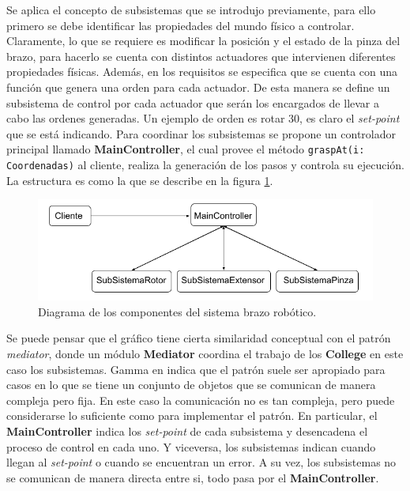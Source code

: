 Se aplica el concepto de subsistemas que se introdujo previamente, para ello primero se debe identificar las propiedades del mundo físico a controlar. Claramente, lo que se requiere es modificar la posición y el estado de la pinza del brazo, para hacerlo se cuenta con distintos actuadores que intervienen diferentes propiedades físicas. Además, en los requisitos se especifica que se cuenta con una función que genera una orden para cada actuador. De esta manera se define un subsistema de control por cada actuador que serán los encargados de llevar a cabo las ordenes generadas. Un ejemplo de orden es rotar 30\textdegree, es claro el \textit{set-point} que se está indicando. Para coordinar los subsistemas se propone un controlador principal llamado \textbf{MainController}, el cual provee el método \verb|graspAt(i: Coordenadas)| al cliente, realiza la generación de los pasos y controla su ejecución. La estructura es como la que se describe en la figura \ref{diagramaRobotico}.


\begin{figure}[h]
\caption{Diagrama de los componentes del sistema brazo robótico.}
\label{diagramaRobotico}
\begin{center}
\includegraphics[scale=0.6]{componentes.png}
\end{center}
\end{figure}



Se puede pensar que el gráfico tiene cierta similaridad conceptual con el patrón \textit{mediator}, donde un módulo \textbf{Mediator} coordina el trabajo de los \textbf{College} en este caso los subsistemas. Gamma en \cite{Gamma:1995:DPE:186897} indica que el patrón suele ser apropiado para casos en lo que se tiene un conjunto de objetos que se comunican de manera compleja pero fija. En este caso la comunicación no es tan compleja, pero puede considerarse lo suficiente como para implementar el patrón. En particular, el \textbf{MainController} indica los \textit{set-point} de cada subsistema y desencadena el proceso de control en cada uno. Y viceversa, los subsistemas indican cuando llegan al \textit{set-point} o cuando se encuentran un error. A su vez, los subsistemas no se comunican de manera directa entre si, todo pasa por el \textbf{MainController}.


